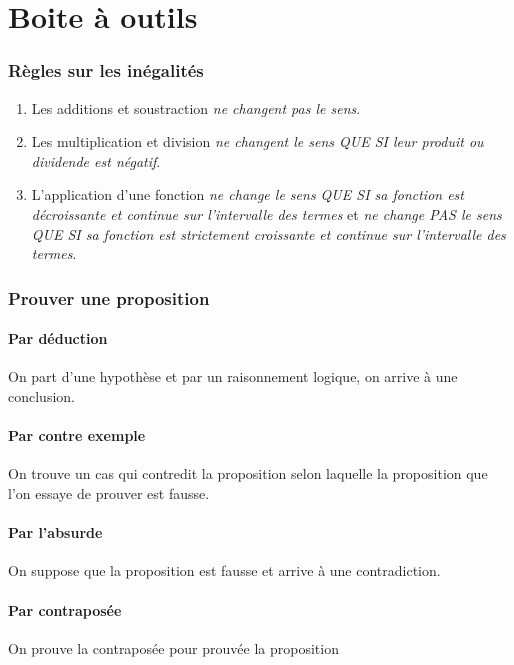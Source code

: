 \documentclass{article}
\begin{document}
\pagebreak\part{Boite à outils}
\setcounter{section}{0}
\renewcommand*{\theHsection}{chX.\the\value{section}}



\section{Règles sur les inégalités}
\begin{enumerate}
	\item Les additions et soustraction \emph{ne changent pas le sens}.
	\item Les multiplication et division \emph{ne changent le sens QUE SI leur produit ou dividende est négatif}.
	\item L'application d'une fonction \emph{ne change le sens QUE SI sa fonction est décroissante et continue sur l'intervalle des termes} et \emph{ne change PAS le sens QUE SI sa fonction est strictement croissante et continue sur l'intervalle des termes}.
\end{enumerate}


\section{Prouver une proposition}

\subsection{Par déduction}
On part d'une hypothèse et par un raisonnement logique, on arrive à une conclusion.

\subsection{Par contre exemple}
On trouve un cas qui contredit la proposition selon laquelle la proposition que l'on essaye de prouver est fausse.

\subsection{Par l'absurde}
On suppose que la proposition est fausse et arrive à une contradiction.

\subsection{Par contraposée}
On prouve la contraposée pour prouvée la proposition
\end{document}
